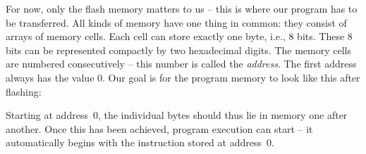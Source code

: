 \documentclass[a4paper,12pt]{article}
\begin{document}
\noindent
For now, only the flash memory matters to us – this is where our program
has to be transferred. All kinds of memory have one thing in common: they
consist of arrays of memory cells. Each cell can store exactly one byte,
i.e., 8 bits. These 8 bits can be represented compactly by two hexadecimal
digits. The memory cells are numbered consecutively – this number is called
the \emph{address}. The first address always has the value 0.
Our goal is for the program memory to look like this after flashing:


\begin{center}
\end{center}

\noindent
Starting at address~0, the individual bytes should thus lie in memory one
after another. Once this has been achieved, program execution can start – it
automatically begins with the instruction stored at address~0.
\end{document}
